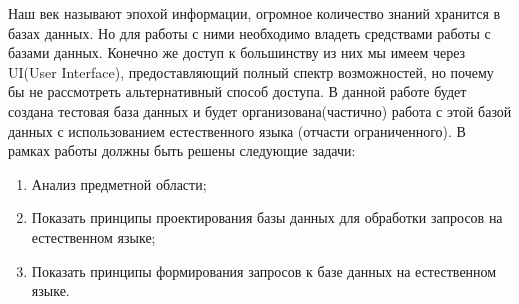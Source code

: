 \Introduction

Наш век называют эпохой информации, огромное количество знаний хранится в базах данных. Но для работы с ними необходимо владеть средствами работы с базами данных. Конечно же доступ к большинству из них мы имеем через UI(User Interface), предоставляющий полный спектр возможностей, но почему бы не рассмотреть альтернативный способ доступа. В данной работе будет создана тестовая база данных и будет организована(частично) работа с этой базой данных с использованием естественного языка (отчасти ограниченного).
В рамках работы должны быть решены следующие задачи:
\begin{enumerate}
  \item Анализ предметной области;
  \item Показать принципы проектирования базы данных для обработки запросов на естественном языке;
  \item Показать принципы формирования запросов к базе данных на естественном языке.
\end{enumerate}